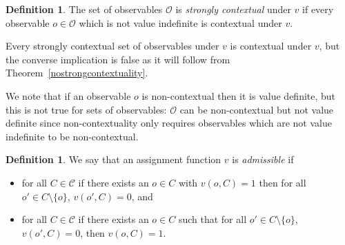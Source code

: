 \documentclass[11pt, a4paper]{article}
\theoremstyle{definition}
\newtheorem{Definition}[Theorem]{Definition}
\begin{document}
\begin{Definition}
	The set of observables $\mathcal{O}$ is \emph{strongly contextual} under $v$ if every observable $o\in\mathcal{O}$ which is not value indefinite %
	is contextual under $v$.
\end{Definition}


Every strongly contextual set of observables under $v$ is contextual under $v$, but  the converse implication is false as it will follow from Theorem~\ref{nostrongcontextuality}.

We note that if an observable $o$ is non-contextual then it is value definite, but this is not true for sets of observables: $\mathcal{O}$ can be non-contextual but not value definite since non-contextuality only requires observables which are not value indefinite to be non-contextual.\\

\begin{Definition}
	We say that an assignment function $v$ is \emph{admissible} if \begin{itemize}
	\item for all $C\in\mathcal{C}$ if there exists an $o\in C$ with $v(o,C)=1$ then for all $o'\in C\setminus\{o\}$, $v(o',C)=0$, and
	\item for all $C\in\mathcal{C}$ if there exists an $o\in C$ such that for all $o'\in C\setminus \{o\}$, $v(o',C)=0$, then $v(o,C)=1$.\\
	\end{itemize}
	\end{Definition}
	
	
\end{document}

